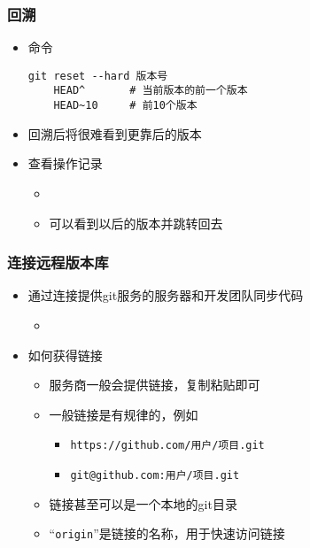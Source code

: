 \begin{CJK}{UTF8}{gbsn}
\begin{frame} [fragile]
	\frametitle{回溯}
	\linespread{1.25}
	\begin{itemize}
	\item 命令
	\begin{lstlisting}[style=bashstyle, gobble=4, texcl, escapechar=@]
	git reset --hard 版本号
	HEAD^		# 当前版本的前一个版本
	HEAD~10		# 前10个版本
	\end{lstlisting}
	\item 回溯后将很难看到更靠后的版本
	\item 查看操作记录
		\begin{itemize}
		\item {}
		\item 可以看到以后的版本并跳转回去
		\end{itemize}
	\end{itemize}
\end{frame}

\begin{frame} [fragile]
	\frametitle{连接远程版本库}
	\linespread{1.5}
	\begin{itemize}
	\item 通过连接提供git服务的服务器和开发团队同步代码
		\begin{itemize}
		\item {}
		\end{itemize}
	\item 如何获得链接
		\begin{itemize}
		\item 服务商一般会提供链接，复制粘贴即可
		\item 一般链接是有规律的，例如
			\begin{itemize}
			\item \texttt{https://github.com/用户/项目.git}
			\item \texttt{git@github.com:用户/项目.git}
			\end{itemize}
		\item 链接甚至可以是一个本地的git目录
		\item ``\texttt{origin}''是链接的名称，用于快速访问链接
		\end{itemize}
	\end{itemize}
\end{frame}


\end{CJK}
